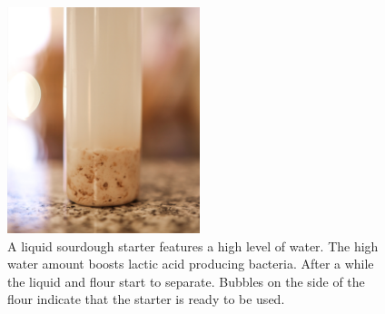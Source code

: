 \begin{figure}[!htb]
  \centering
  \includegraphics[width=0.5\textwidth]{sourdough-starter-liquid.jpg}
  \caption{A liquid sourdough starter features a high level of water. The high
  water amount boosts lactic acid producing bacteria. After a while the liquid
  and flour start to separate. Bubbles on the side of the flour
  indicate that the starter is ready to be used.}
  \label{fig:liquid-sourdough-starter}
\end{figure}

